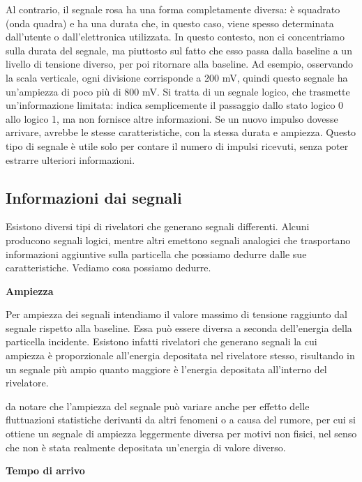 Al contrario, il segnale rosa ha una forma completamente diversa: è squadrato (onda quadra) e ha una durata che, in questo caso, viene spesso determinata dall'utente o dall'elettronica utilizzata. In questo contesto, non ci concentriamo sulla durata del segnale, ma piuttosto sul fatto che esso passa dalla baseline a un livello di tensione diverso, per poi ritornare alla baseline. Ad esempio, osservando la scala verticale, ogni divisione corrisponde a 200 mV, quindi questo segnale ha un'ampiezza di poco più di 800 mV. Si tratta di un segnale logico, che trasmette un'informazione limitata: indica semplicemente il passaggio dallo stato logico 0 allo logico 1, ma non fornisce altre informazioni. Se un nuovo impulso dovesse arrivare, avrebbe le stesse caratteristiche, con la stessa durata e ampiezza. Questo tipo di segnale è utile solo per contare il numero di impulsi ricevuti, senza poter estrarre ulteriori informazioni.

\subsection{Informazioni dai segnali}

Esistono diversi tipi di rivelatori che generano segnali differenti. Alcuni producono segnali logici, mentre altri emettono segnali analogici che trasportano informazioni aggiuntive sulla particella che possiamo dedurre dalle sue caratteristiche. Vediamo cosa possiamo dedurre.

\vspace{0.2cm}\textbf{Ampiezza}

Per ampiezza dei segnali intendiamo il valore massimo di tensione raggiunto dal segnale rispetto alla baseline. Essa può essere diversa a seconda dell'energia della particella incidente. Esistono infatti rivelatori che generano segnali la cui ampiezza è proporzionale all'energia depositata nel rivelatore stesso, risultando in un segnale più ampio quanto maggiore è l'energia depositata all'interno del rivelatore.

\E da notare che l'ampiezza del segnale può variare anche per effetto delle fluttuazioni statistiche derivanti da altri fenomeni o a causa del rumore, per cui si ottiene un segnale di ampiezza leggermente diversa per motivi non fisici, nel senso che non è stata realmente depositata un'energia di valore diverso.

\vspace{0.2cm}\textbf{Tempo di arrivo}

